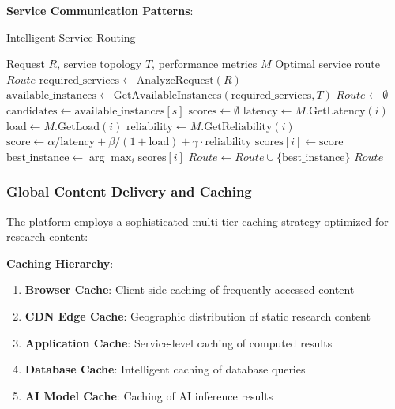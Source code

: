\documentclass[10pt,twocolumn]{article}
\begin{document}
\textbf{Service Communication Patterns}:

\begin{algorithm}[H]
\caption{Intelligent Service Routing}
\label{alg:service_routing}
\begin{algorithmic}[1]
\REQUIRE Request $R$, service topology $T$, performance metrics $M$
\ENSURE Optimal service route $Route$
\STATE $\text{required\_services} \leftarrow \text{AnalyzeRequest}(R)$
\STATE $\text{available\_instances} \leftarrow \text{GetAvailableInstances}(\text{required\_services}, T)$
\STATE $Route \leftarrow \emptyset$
    \STATE $\text{candidates} \leftarrow \text{available\_instances}[s]$
    \STATE $\text{scores} \leftarrow \emptyset$
        \STATE $\text{latency} \leftarrow M.\text{GetLatency}(i)$
        \STATE $\text{load} \leftarrow M.\text{GetLoad}(i)$
        \STATE $\text{reliability} \leftarrow M.\text{GetReliability}(i)$
        \STATE $\text{score} \leftarrow \alpha/\text{latency} + \beta/(1+\text{load}) + \gamma \cdot \text{reliability}$
        \STATE $\text{scores}[i] \leftarrow \text{score}$
    \ENDFOR
    \STATE $\text{best\_instance} \leftarrow \arg\max_i \text{scores}[i]$
    \STATE $Route \leftarrow Route \cup \{\text{best\_instance}\}$
\ENDFOR
\RETURN $Route$
\end{algorithmic}
\end{algorithm}

\subsubsection{Global Content Delivery and Caching}

The platform employs a sophisticated multi-tier caching strategy optimized for research content:

\textbf{Caching Hierarchy}:
\begin{enumerate}
    \item \textbf{Browser Cache}: Client-side caching of frequently accessed content
    \item \textbf{CDN Edge Cache}: Geographic distribution of static research content
    \item \textbf{Application Cache}: Service-level caching of computed results
    \item \textbf{Database Cache}: Intelligent caching of database queries
    \item \textbf{AI Model Cache}: Caching of AI inference results
\end{enumerate}
\end{document}
